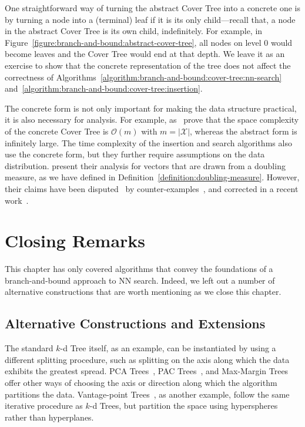 One straightforward way of turning the abstract Cover Tree into a concrete one
is by turning a node into a (terminal) leaf if it is its only child---recall that,
a node in the abstract Cover Tree is its own child, indefinitely. For example,
in Figure~\ref{figure:branch-and-bound:abstract-cover-tree}, all nodes on level
$0$ would become leaves and the Cover Tree would end at that depth.
We leave it as an exercise to show that the concrete representation of the tree
does not affect the correctness of Algorithms~\ref{algorithm:branch-and-bound:cover-tree:nn-search}
and~\ref{algorithm:branch-and-bound:cover-tree:insertion}.

The concrete form is not only important for making the data structure practical,
it is also necessary for analysis. For example, as~\cite{covertrees} prove that
the space complexity of the concrete Cover Tree is $\mathcal{O}(m)$ with $m=\lvert \mathcal{X} \rvert$,
whereas the abstract form is infinitely large.
The time complexity of the insertion and search algorithms also use the
concrete form, but they further require assumptions on the data distribution.
\cite{covertrees} present their analysis for vectors that are drawn from
a doubling measure, as we have defined in Definition~\ref{definition:doubling-measure}.
However, their claims have been disputed~\citep{curtin2016phd}
by counter-examples~\citep{elkin2022counterexamples},
and corrected in a recent work~\citep{elkin2023compressed-cover-trees}.

\section{Closing Remarks}

This chapter has only covered algorithms that convey the foundations of
a branch-and-bound approach to NN search. Indeed, we left out a number of
alternative constructions that are worth mentioning as we close this chapter.

\subsection{Alternative Constructions and Extensions}

The standard $k$-d Tree itself, as an example, can be instantiated
by using a different splitting procedure, such as splitting on the axis
along which the data exhibits the greatest spread.
PCA Trees~\citep{Sproull1991pcatrees}, PAC Trees~\citep{pactrees}, and
Max-Margin Trees~\citep{maxmargintrees} offer other ways of choosing the axis
or direction along which the algorithm partitions the data.
Vantage-point Trees~\citep{vptrees}, as another example, follow the same
iterative procedure as $k$-d Trees, but partition the space using hyperspheres
rather than hyperplanes.

